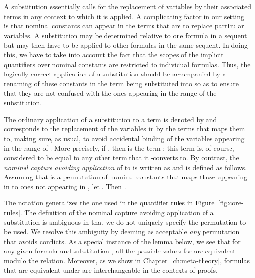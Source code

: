 A substitution essentially calls for the replacement of
variables by their associated terms in any context to which it is
applied. A complicating factor in our setting is that nominal
constants can appear in the terms that are to replace
particular variables. A substitution may be determined relative to one
formula in a sequent but may then have to be applied to other formulas
in the same sequent. In doing this, we have to take into account the
fact that the scopes of the implicit quantifiers over nominal
constants are restricted to individual formulas. Thus, the logically
correct application of a substitution should be accompanied by a
renaming of these constants in the term being substituted into so as to
ensure that they are not confused with the ones appearing in
the range of the substitution.

\begin{definition}\label{ncasubst}
The ordinary application of a substitution  to a term  is
denoted by  and corresponds to the replacement of the
variables in  by the terms that  maps them to, making sure,
as usual, to avoid accidental binding of the variables appearing in
the range of . More precisely, if , then  is the term ; this term is, of course, considered to be equal
to any other term that it -converts to. By contrast,
the {\em nominal capture avoiding application} of  to  is
written as  and is defined as follows. Assuming that
 is a permutation of nominal constants that maps those appearing
in  to ones not appearing in , let . Then .
\end{definition}

The notation  generalizes the one
used in the quantifier rules in Figure~\ref{fig:core-rules}.
The definition of the nominal capture avoiding application of a
substitution is ambiguous in that we do not uniquely specify the
permutation to be used.  We resolve this ambiguity by deeming as
acceptable {\it any} permutation that avoids conflicts. As a special
instance of the lemma below, we see that for any given formula  and
substitution ,
all the possible values for  are equivalent modulo the
 relation. Moreover, as we show in
Chapter~\ref{ch:meta-theory}, formulas that are equivalent under
 are interchangeable in the contexts of proofs.

